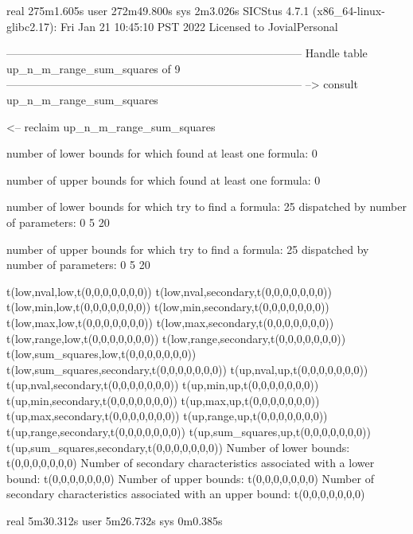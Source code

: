 real	275m1.605s
user	272m49.800s
sys	2m3.026s
SICStus 4.7.1 (x86_64-linux-glibc2.17): Fri Jan 21 10:45:10 PST 2022
Licensed to JovialPersonal


--------------------------------------------------------------------------------
Handle table up_n_m_range_sum_squares of 9
--------------------------------------------------------------------------------
--> consult up_n_m_range_sum_squares

<-- reclaim up_n_m_range_sum_squares

number of lower bounds for which found at least one formula: 0

number of upper bounds for which found at least one formula: 0

number of lower bounds for which try to find a formula: 25
dispatched by number of parameters: 0  5  20

number of upper bounds for which try to find a formula: 25
dispatched by number of parameters: 0  5  20

t(low,nval,low,t(0,0,0,0,0,0,0))
t(low,nval,secondary,t(0,0,0,0,0,0,0))
t(low,min,low,t(0,0,0,0,0,0,0))
t(low,min,secondary,t(0,0,0,0,0,0,0))
t(low,max,low,t(0,0,0,0,0,0,0))
t(low,max,secondary,t(0,0,0,0,0,0,0))
t(low,range,low,t(0,0,0,0,0,0,0))
t(low,range,secondary,t(0,0,0,0,0,0,0))
t(low,sum_squares,low,t(0,0,0,0,0,0,0))
t(low,sum_squares,secondary,t(0,0,0,0,0,0,0))
t(up,nval,up,t(0,0,0,0,0,0,0))
t(up,nval,secondary,t(0,0,0,0,0,0,0))
t(up,min,up,t(0,0,0,0,0,0,0))
t(up,min,secondary,t(0,0,0,0,0,0,0))
t(up,max,up,t(0,0,0,0,0,0,0))
t(up,max,secondary,t(0,0,0,0,0,0,0))
t(up,range,up,t(0,0,0,0,0,0,0))
t(up,range,secondary,t(0,0,0,0,0,0,0))
t(up,sum_squares,up,t(0,0,0,0,0,0,0))
t(up,sum_squares,secondary,t(0,0,0,0,0,0,0))
Number of lower bounds:                                             t(0,0,0,0,0,0,0)
Number of secondary characteristics associated with a lower bound:  t(0,0,0,0,0,0,0)
Number of upper bounds:                                             t(0,0,0,0,0,0,0)
Number of secondary characteristics associated with an upper bound: t(0,0,0,0,0,0,0)

real	5m30.312s
user	5m26.732s
sys	0m0.385s
